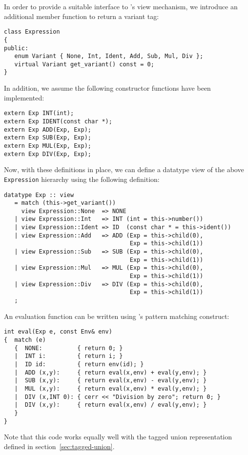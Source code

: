 In order to provide a suitable interface to \Prop's view mechanism,
we introduce an additional member function to return a variant tag:

\begin{verbatim}
class Expression
{
public:
   enum Variant { None, Int, Ident, Add, Sub, Mul, Div };
   virtual Variant get_variant() const = 0;
}
\end{verbatim}

In addition, we assume the following constructor functions have been
implemented:

\begin{verbatim}
extern Exp INT(int);
extern Exp IDENT(const char *);
extern Exp ADD(Exp, Exp);
extern Exp SUB(Exp, Exp);
extern Exp MUL(Exp, Exp);
extern Exp DIV(Exp, Exp);
\end{verbatim}

Now, with these definitions in place, we can define a datatype view of the
above \verb|Expression| hierarchy using the following definition:

\begin{verbatim}
datatype Exp :: view
   = match (this->get_variant())
     view Expression::None  => NONE
   | view Expression::Int   => INT (int = this->number()) 
   | view Expression::Ident => ID  (const char * = this->ident())
   | view Expression::Add   => ADD (Exp = this->child(0), 
                                    Exp = this->child(1))
   | view Expression::Sub   => SUB (Exp = this->child(0), 
                                    Exp = this->child(1))
   | view Expression::Mul   => MUL (Exp = this->child(0), 
                                    Exp = this->child(1))
   | view Expression::Div   => DIV (Exp = this->child(0), 
                                    Exp = this->child(1))
   ;
\end{verbatim}

An evaluation function can be written
using \Prop's pattern matching construct:

\begin{verbatim}
int eval(Exp e, const Env& env)
{  match (e) 
   {  NONE:          { return 0; }
   |  INT i:         { return i; }
   |  ID id:         { return env(id); }
   |  ADD (x,y):     { return eval(x,env) + eval(y,env); }
   |  SUB (x,y):     { return eval(x,env) - eval(y,env); }
   |  MUL (x,y):     { return eval(x,env) * eval(y,env); }
   |  DIV (x,INT 0): { cerr << "Division by zero"; return 0; }
   |  DIV (x,y):     { return eval(x,env) / eval(y,env); }
   }
}
\end{verbatim}
Note that this code works equally well with the tagged union representation
defined in section~\ref{sec:tagged-union}. 

